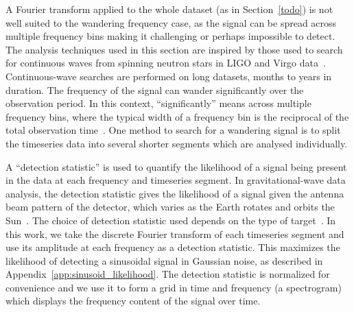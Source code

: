 \documentclass[paper-main.tex]{subfiles}
\begin{document}
A Fourier transform applied to the whole dataset (as in Section~\ref{todo}) is not well suited to the wandering frequency case, as the signal can be spread across multiple frequency bins making it challenging or perhaps impossible to detect. 
The analysis techniques used in this section are inspired by those used to search for continuous waves from spinning neutron stars in LIGO and Virgo data~\cite{SuvorovaEtAl:2016,SuvorovaEtAl:2017}. 
Continuous-wave searches are performed on long datasets, months to years in duration. 
The frequency of the signal can wander significantly over the observation period. 
In this context, ``significantly'' means across multiple frequency bins, where the typical width of a frequency bin is the reciprocal of the total observation time~\cite{JKS:1998,ScoX1O2Viterbi:2019}.
One method to search for a wandering signal is to split the timeseries data into several shorter segments which are analysed individually.%

A ``detection statistic'' is used to quantify the likelihood of a signal being present in the data at each frequency and timeseries segment. 
In gravitational-wave data analysis, the detection statistic gives the likelihood of a signal given the antenna beam pattern of the detector, which varies as the Earth rotates and orbits the Sun~\cite{JKS:1998}. 
The choice of detection statistic used depends on the type of target~\cite{JKS:1998,SuvorovaEtAl:2017}.
In this work, we take the discrete Fourier transform of each timeseries segment and use its amplitude at each frequency as a detection statistic.
This maximizes the likelihood of detecting a sinusoidal signal in Gaussian noise, as described in Appendix~\ref{app:sinusoid_likelihood}. 
The detection statistic is normalized for convenience and we use it to form a grid in time and frequency (a spectrogram) which displays the frequency content of the signal over time. 
\end{document}

